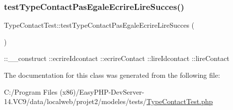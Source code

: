 \subsubsection{\texorpdfstring{test\+Type\+Contact\+Pas\+Egale\+Ecrire\+Lire\+Succes()}{testTypeContactPasEgaleEcrireLireSucces()}}
{\footnotesize\ttfamily Type\+Contact\+Test\+::test\+Type\+Contact\+Pas\+Egale\+Ecrire\+Lire\+Succes (\begin{DoxyParamCaption}{ }\end{DoxyParamCaption})}

\+::\+\_\+\+\_\+construct  \+::ecrire\+Idcontact  \+::ecrire\+Contact  \+::lire\+Idcontact  \+::lire\+Contact 

The documentation for this class was generated from the following file\+:\begin{DoxyCompactItemize}
\item 
C\+:/\+Program Files (x86)/\+Easy\+P\+H\+P-\/\+Dev\+Server-\/14.\+V\+C9/data/localweb/projet2/modeles/tests/\hyperlink{_type_contact_test_8php}{Type\+Contact\+Test.\+php}\end{DoxyCompactItemize}
